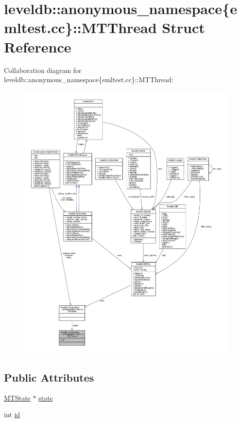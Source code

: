 \hypertarget{structleveldb_1_1anonymous__namespace_02emltest_8cc_03_1_1_m_t_thread}{}\section{leveldb\+:\+:anonymous\+\_\+namespace\{emltest.\+cc\}\+:\+:M\+T\+Thread Struct Reference}
\label{structleveldb_1_1anonymous__namespace_02emltest_8cc_03_1_1_m_t_thread}


Collaboration diagram for leveldb\+:\+:anonymous\+\_\+namespace\{emltest.\+cc\}\+:\+:M\+T\+Thread\+:
\nopagebreak
\begin{figure}[H]
\begin{center}
\leavevmode
\includegraphics[width=350pt]{structleveldb_1_1anonymous__namespace_02emltest_8cc_03_1_1_m_t_thread__coll__graph}
\end{center}
\end{figure}
\subsection*{Public Attributes}
\begin{DoxyCompactItemize}
\item 
\hyperlink{structleveldb_1_1anonymous__namespace_02emltest_8cc_03_1_1_m_t_state}{M\+T\+State} $\ast$ \hyperlink{structleveldb_1_1anonymous__namespace_02emltest_8cc_03_1_1_m_t_thread_a79b167759c115d81c7b2f9737c794c66}{state}
\item 
int \hyperlink{structleveldb_1_1anonymous__namespace_02emltest_8cc_03_1_1_m_t_thread_ae864ab2e634be5f2fb741b8a2aed9aba}{id}
\end{DoxyCompactItemize}


